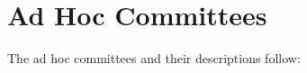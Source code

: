 \section{Ad Hoc Committees}\label{sec:AdHocCommittees} The ad hoc committees and their descriptions follow:\\



